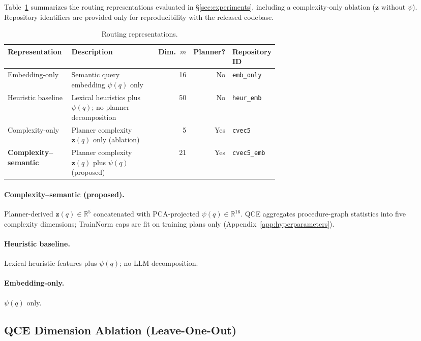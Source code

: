 Table~\ref{tab:feature-configs-full} summarizes the routing representations evaluated
in \S\ref{sec:experiments}, including a complexity-only ablation ($\mathbf{z}$ without $\psi$).
Repository identifiers are provided only for reproducibility with the released codebase.

\begin{table}[h]
  \centering
  \footnotesize
  \caption{Routing representations.}
  \label{tab:feature-configs-full}
  \begin{tabular}{@{}p{0.24\linewidth}p{0.38\linewidth}rrl@{}}
    \toprule
    Representation & Description & Dim.\ $m$ & Planner? & Repository ID \\
    \midrule
    Embedding-only &
      Semantic query embedding $\psi(q)$ only &
      16 & No & \texttt{emb\_only} \\
    Heuristic baseline &
      Lexical heuristics plus $\psi(q)$; no planner decomposition &
      50 & No & \texttt{heur\_emb} \\
    Complexity-only &
      Planner complexity $\mathbf{z}(q)$ only (ablation) &
      5 & Yes & \texttt{cvec5} \\
    \textbf{Complexity--semantic} &
      Planner complexity $\mathbf{z}(q)$ plus $\psi(q)$ (proposed) &
      21 & Yes & \texttt{cvec5\_emb} \\
    \bottomrule
  \end{tabular}
\end{table}

\paragraph{Complexity--semantic (proposed).}
Planner-derived $\mathbf{z}(q)\in\mathbb{R}^5$ concatenated with PCA-projected
$\psi(q)\in\mathbb{R}^{16}$.
QCE aggregates procedure-graph statistics into five complexity dimensions; TrainNorm caps
are fit on training plans only (Appendix~\ref{app:hyperparameters}).

\paragraph{Heuristic baseline.}
Lexical heuristic features plus $\psi(q)$; no LLM decomposition.

\paragraph{Embedding-only.}
$\psi(q)$ only.

\subsection{QCE Dimension Ablation (Leave-One-Out)}
\label{app:qce-dim-loo}


